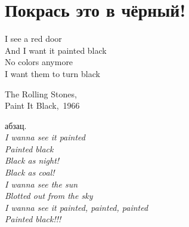 \chapter{Покрась это в чёрный!} 
\vepsianrose

\setlength{\epigraphwidth}{0.45\textwidth}

\epigraph{%
	I see a red door \\
	And I want it painted black \\
	No colors anymore \\
	I want them to turn black }
	{
	\begin{flushright}
		\small{The Rolling Stones,\\Paint It Black,~1966}
	\end{flushright}
	}


абзац.\\
\textit{
\hspace*{35mm} I wanna see it painted\\
\hspace*{35mm} Painted black\\
\hspace*{35mm} Black as night!\\
\hspace*{35mm} Black as coal!\\
\hspace*{35mm} I wanna see the sun\\
\hspace*{35mm} Blotted out from the sky\\
\hspace*{35mm} I wanna see it painted, painted, painted\\
\hspace*{35mm} Painted black!!!
}
\begin{center}
\end{center}
